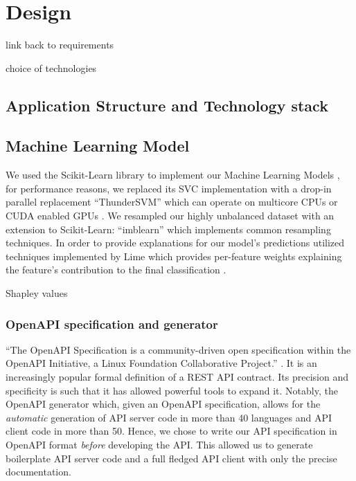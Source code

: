 \documentclass{l4proj}
\begin{document}
\chapter{Design}

link back to requirements

choice of technologies

\section{Application Structure and Technology stack}

\section{Machine Learning Model}


We used the Scikit-Learn library to implement our Machine Learning Models \autocite{pedregosaScikitlearnMachineLearning2011}, for performance reasons, we replaced its SVC implementation with a drop-in parallel replacement ``ThunderSVM'' which can operate on multicore CPUs or CUDA enabled GPUs \autocite{wenThunderSVMFastSVM2018}.
We resampled our highly unbalanced dataset with an extension to Scikit-Learn: ``imblearn'' which implements common resampling techniques\autocite{lemaitreImbalancedlearnPythonToolbox2017}.
In order to provide explanations for our model's predictions utilized techniques implemented by Lime which provides per-feature weights explaining the feature's contribution to the final classification \autocite{ribeiroWhyShouldTrust2016a}.

\autocite{lundbergUnifiedApproachInterpreting2017a} Shapley values


\subsection{OpenAPI specification and generator}

``The OpenAPI Specification is a community-driven open specification within the OpenAPI Initiative, a Linux Foundation Collaborative Project.'' \autocite{OAIOpenAPISpecification2020}. 
It is an increasingly popular formal definition of a REST API contract. 
Its precision and specificity is such that it has allowed powerful tools to expand it.
Notably, the OpenAPI generator \autocite{OpenAPIToolsOpenapigenerator2020} which, given an OpenAPI specification, allows for the \textit{automatic} generation of API server code in more than 40 languages and API client code in more than 50.
Hence, we chose to write our API specification in OpenAPI format \textit{before} developing the API.
This allowed us to generate boilerplate API server code and a full fledged API client with only the precise documentation.
\end{document}
